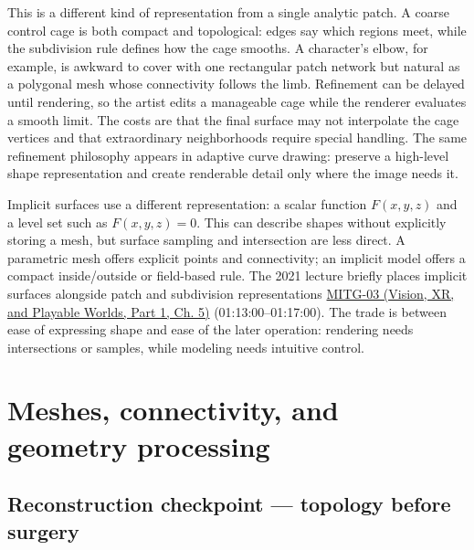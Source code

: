 This is a different kind of representation from a single analytic patch. A coarse control cage is both compact and topological: edges say which regions meet, while the subdivision rule defines how the cage smooths. A character's elbow, for example, is awkward to cover with one rectangular patch network but natural as a polygonal mesh whose connectivity follows the limb. Refinement can be delayed until rendering, so the artist edits a manageable cage while the renderer evaluates a smooth limit. The costs are that the final surface may not interpolate the cage vertices and that extraordinary neighborhoods require special handling. The same refinement philosophy appears in adaptive curve drawing: preserve a high-level shape representation and create renderable detail only where the image needs it.

Implicit surfaces use a different representation: a scalar function \(F(x,y,z)\) and a level set such as \(F(x,y,z)=0\). This can describe shapes without explicitly storing a mesh, but surface sampling and intersection are less direct. A parametric mesh offers explicit points and connectivity; an implicit model offers a compact inside/outside or field-based rule. The 2021 lecture briefly places implicit surfaces alongside patch and subdivision representations \href{../07-Vision-XR-and-Playable-Worlds-P01/main.pdf\#nameddest=04-visual-computing-ii-ch036-mitg-03---curves-and-surfaces}{MITG-03 (Vision, XR, and Playable Worlds, Part 1, Ch. 5)} (01:13:00--01:17:00). The trade is between ease of expressing shape and ease of the later operation: rendering needs intersections or samples, while modeling needs intuitive control.

\section{Meshes, connectivity, and geometry processing}\label{03-visual-computing-i-ch002-meshes-connectivity-and-geometry-processing}

\hypertarget{03-visual-computing-i-ch002-meshes-connectivity-and-geometry-processing}{}

\subsection{Reconstruction checkpoint --- topology before surgery}\label{03-visual-computing-i-ch002-reconstruction-checkpoint-topology-before-surgery}

\hypertarget{03-visual-computing-i-ch002-reconstruction-checkpoint-topology-before-surgery}{}

